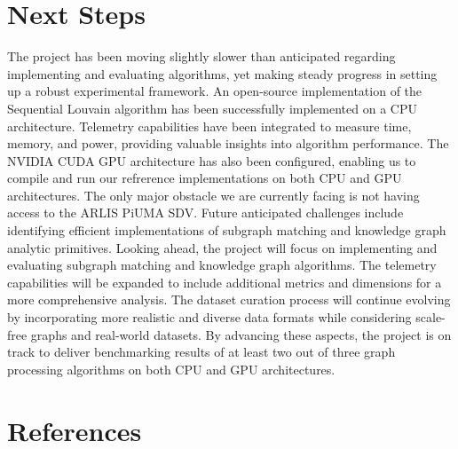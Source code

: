 \documentclass[letterpaper, 10pt]{article}
\begin{document}
\begin{multicols}{2}
{    \section{Next Steps}\label{section:nextSteps}
        The project has been moving slightly slower than anticipated regarding implementing and evaluating algorithms, yet making steady progress in setting up a robust experimental framework.
        An open-source implementation of the Sequential Louvain algorithm has been successfully implemented on a CPU architecture. 
        Telemetry capabilities have been integrated to measure time, memory, and power, providing valuable insights into algorithm performance. 
        The NVIDIA CUDA GPU architecture has also been configured, enabling us to compile and run our refrerence implementations on both CPU and GPU architectures. 
        The only major obstacle we are currently facing is not having access to the ARLIS PiUMA SDV. 
        Future anticipated challenges include identifying efficient implementations of subgraph matching and knowledge graph analytic primitives. 
        Looking ahead, the project will focus on implementing and evaluating subgraph matching and knowledge graph algorithms. 
        The telemetry capabilities will be expanded to include additional metrics and dimensions for a more comprehensive analysis. 
        The dataset curation process will continue evolving by incorporating more realistic and diverse data formats while considering scale-free graphs and real-world datasets. 
        By advancing these aspects, the project is on track to deliver benchmarking results of at least two out of three graph processing algorithms on both CPU and GPU architectures. 
        
    \section{References}
        \printbibliography[heading=none]

}
\end{multicols}
\end{document}
